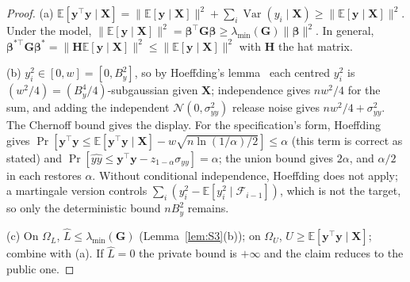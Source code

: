 \documentclass[11pt]{article}
\theoremstyle{definition}
\theoremstyle{plain}
\newcommand{\bX}{\mathbf{X}}
\newcommand{\bG}{\mathbf{G}}
\newcommand{\by}{\mathbf{y}}
\newcommand{\bbeta}{\boldsymbol{\beta}}
\newcommand{\Ex}{\mathbb{E}}
\DeclareMathOperator{\Var}{Var}
\newcommand{\lmin}{\lambda_{\min}}
\begin{document}
\begin{proof}
(a) $\Ex[\by^\top\by\mid\bX]=\|\Ex[\by\mid\bX]\|^2+\sum_i\Var(y_i\mid\bX)\ge\|\Ex[\by\mid\bX]\|^2$. Under the model, $\|\Ex[\by\mid\bX]\|^2=\bbeta^\top\bG\bbeta\ge\lmin(\bG)\|\bbeta\|^2$. In general, $\bbeta^{*\top}\bG\bbeta^*=\|\mathbf H\Ex[\by\mid\bX]\|^2\le\|\Ex[\by\mid\bX]\|^2$ with $\mathbf H$ the hat matrix.

(b) $y_i^2\in[0,w]=[0,B_y^2]$, so by Hoeffding's lemma~\cite{Hoeffding63} each centred $y_i^2$ is $(w^2/4)=(B_y^4/4)$-subgaussian given $\bX$; independence gives $nw^2/4$ for the sum, and adding the independent $\mathcal N(0,\sigma_{yy}^2)$ release noise gives $nw^2/4+\sigma_{yy}^2$. The Chernoff bound gives the display. For the specification's form, Hoeffding gives $\Pr[\by^\top\by\le\Ex[\by^\top\by\mid\bX]-w\sqrt{n\ln(1/\alpha)/2}]\le\alpha$ (this term is correct as stated) and $\Pr[\widehat{yy}\le\by^\top\by-z_{1-\alpha}\sigma_{yy}]=\alpha$; the union bound gives $2\alpha$, and $\alpha/2$ in each restores $\alpha$. Without conditional independence, Hoeffding does not apply; a martingale version controls $\sum_i(y_i^2-\Ex[y_i^2\mid\mathcal F_{i-1}])$, which is not the target, so only the deterministic bound $nB_y^2$ remains.

(c) On $\Omega_L$, $\hat L\le\lmin(\bG)$ (Lemma~\ref{lem:S3}(b)); on $\Omega_U$, $U\ge\Ex[\by^\top\by\mid\bX]$; combine with (a). If $\hat L=0$ the private bound is $+\infty$ and the claim reduces to the public one.
\end{proof}
\end{document}
